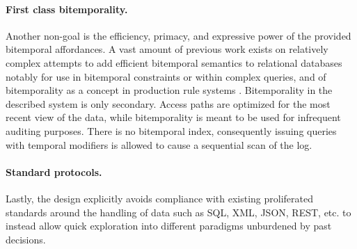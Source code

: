 \paragraph{First class bitemporality.}
Another non-goal is the efficiency, primacy, and expressive power of the provided bitemporal affordances. A vast amount of previous work exists on relatively complex attempts to add efficient bitemporal semantics to relational databases \cite{snodgrass1996adding,jensen1999temporal,kulkarni2012temporal} notably for use in bitemporal constraints \cite{doucet1997using} or within complex queries, and of bitemporality as a concept in production rule systems \cite{aref2015design}. Bitemporality in the described system is only secondary. Access paths are optimized for the most recent view of the data, while bitemporality is meant to be used for infrequent auditing purposes. There is no bitemporal index, consequently issuing queries with temporal modifiers is allowed to cause a sequential scan of the log.

\paragraph{Standard protocols.}
Lastly, the design explicitly avoids compliance with existing proliferated standards around the handling of data such as SQL, \gls{XML}, \gls{JSON}, \gls{REST}, etc. to instead allow quick exploration into different paradigms unburdened by past decisions.
